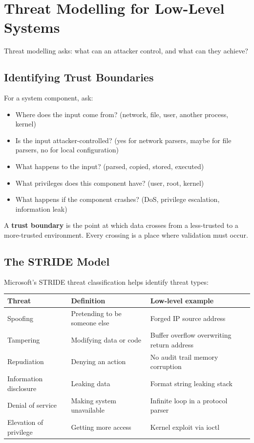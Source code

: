 \section{Threat Modelling for Low-Level Systems}

Threat modelling asks: what can an attacker control, and what can they achieve?

\subsection{Identifying Trust Boundaries}

For a system component, ask:

\begin{itemize}
	\item Where does the input come from? (network, file, user, another process, kernel)
	\item Is the input attacker-controlled? (yes for network parsers, maybe for file parsers, no for local configuration)
	\item What happens to the input? (parsed, copied, stored, executed)
	\item What privileges does this component have? (user, root, kernel)
	\item What happens if the component crashes? (DoS, privilege escalation, information leak)
\end{itemize}

\begin{definition}
	A \textbf{trust boundary} is the point at which data crosses from a less-trusted to a more-trusted environment. Every crossing is a place where validation must occur.
\end{definition}

\subsection{The STRIDE Model}

Microsoft's STRIDE threat classification helps identify threat types:

\begin{longtable}{p{2.5cm}p{4cm}p{5cm}}
	\toprule
	\textbf{Threat}        & \textbf{Definition}           & \textbf{Low-level example}                 \\
	\midrule
	Spoofing               & Pretending to be someone else & Forged IP source address                   \\
	Tampering              & Modifying data or code        & Buffer overflow overwriting return address \\
	Repudiation            & Denying an action             & No audit trail memory corruption           \\
	Information disclosure & Leaking data                  & Format string leaking stack                \\
	Denial of service      & Making system unavailable     & Infinite loop in a protocol parser         \\
	Elevation of privilege & Getting more access           & Kernel exploit via ioctl                   \\
	\bottomrule
\end{longtable}

